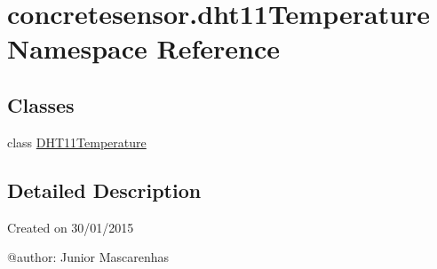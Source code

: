 \hypertarget{namespaceconcretesensor_1_1dht11Temperature}{}\section{concretesensor.\+dht11\+Temperature Namespace Reference}
\label{namespaceconcretesensor_1_1dht11Temperature}
\subsection*{Classes}
\begin{DoxyCompactItemize}
\item 
class \hyperlink{classconcretesensor_1_1dht11Temperature_1_1DHT11Temperature}{D\+H\+T11\+Temperature}
\end{DoxyCompactItemize}


\subsection{Detailed Description}
\begin{DoxyVerb}Created on 30/01/2015

@author: Junior Mascarenhas
\end{DoxyVerb}
 